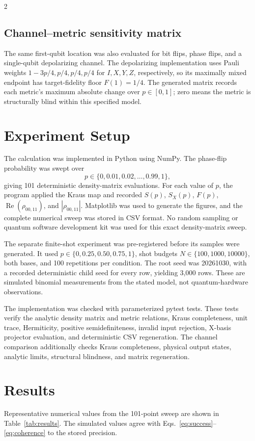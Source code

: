 \documentclass[a4paper,10pt]{article}
\begin{document}
\begin{multicols}{2}
\subsection*{Channel--metric sensitivity matrix}
The same first-qubit location was also evaluated for bit flips, phase flips,
and a single-qubit depolarizing channel.  The depolarizing implementation uses
Pauli weights $1-3p/4,p/4,p/4,p/4$ for $I,X,Y,Z$, respectively, so its
maximally mixed endpoint has target-fidelity floor $F(1)=1/4$.  The generated
matrix records each metric's maximum absolute change over $p\in[0,1]$; zero
means the metric is structurally blind within this specified model.

\section*{Experiment Setup}
The calculation was implemented in Python using NumPy.  The phase-flip
probability was swept over
\begin{equation}
p\in\{0,0.01,0.02,\ldots,0.99,1\},
\end{equation}
giving 101 deterministic density-matrix evaluations.  For each value of $p$,
the program applied the Kraus map and recorded $S(p)$, $S_X(p)$, $F(p)$,
$\operatorname{Re}(\rho_{00,11})$, and $|\rho_{00,11}|$.  Matplotlib was used
to generate the figures, and the complete numerical sweep was stored in CSV
format.  No random sampling or quantum software development kit was used for
this exact density-matrix sweep.

The separate finite-shot experiment was pre-registered before its samples
were generated.  It used $p\in\{0,0.25,0.50,0.75,1\}$, shot budgets
$N\in\{100,1000,10000\}$, both bases, and 100 repetitions per condition.
The root seed was 20261030, with a recorded deterministic child seed for every
row, yielding 3,000 rows.  These are simulated binomial measurements from the
stated model, not quantum-hardware observations.

The implementation was checked with parameterized pytest tests. These tests
verify the analytic density matrix and metric relations, Kraus completeness,
unit trace, Hermiticity, positive semidefiniteness, invalid input rejection,
X-basis projector evaluation, and deterministic CSV regeneration.
The channel comparison additionally checks Kraus completeness, physical output
states, analytic limits, structural blindness, and matrix regeneration.

\section*{Results}
Representative numerical values from the 101-point sweep are shown in
Table~\ref{tab:results}.  The simulated values agree with
Eqs.~\eqref{eq:success}--\eqref{eq:coherence} to the stored precision.


\end{multicols}
\end{document}
